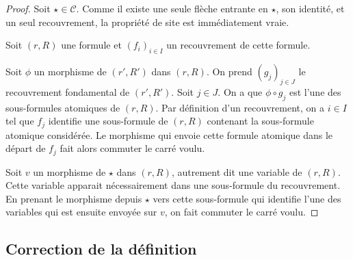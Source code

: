 \documentclass[12pt]{article}
\renewcommand\C{\mathscr{C}}
\begin{document}
\begin{proof}
    Soit $\star\in\C$. Comme il existe une seule flèche entrante en $\star$, son identité,
    et un seul recouvrement, la propriété de site est immédiatement vraie.

    Soit $(r,R)$ une formule et $(f_i)_{i\in I}$ un recouvrement de cette formule.
    
    Soit $\phi$ un morphisme de $(r', R')$ dans $(r,R)$. On prend $(g_j)_{j\in J}$ le
    recouvrement fondamental de $(r', R')$. Soit $j\in J$. On a que $\phi\circ g_j$ est
    l'une des sous-formules atomiques de $(r,R)$. Par définition d'un recouvrement, on
    a $i\in I$ tel que $f_j$ identifie une sous-formule de $(r,R)$ contenant la
    sous-formule atomique considérée. Le morphisme qui envoie cette formule atomique
    dans le départ de $f_j$ fait alors commuter le carré voulu.

    Soit $v$ un morphisme de $\star$ dans $(r,R)$, autrement dit une variable de $(r,R)$.
    Cette variable apparait nécessairement dans une sous-formule du recouvrement. En
    prenant le morphisme depuis $\star$ vers cette sous-formule qui identifie l'une des
    variables qui est ensuite envoyée sur $v$, on fait commuter le carré voulu.
\end{proof}

\subsection{Correction de la définition}

\end{document}
